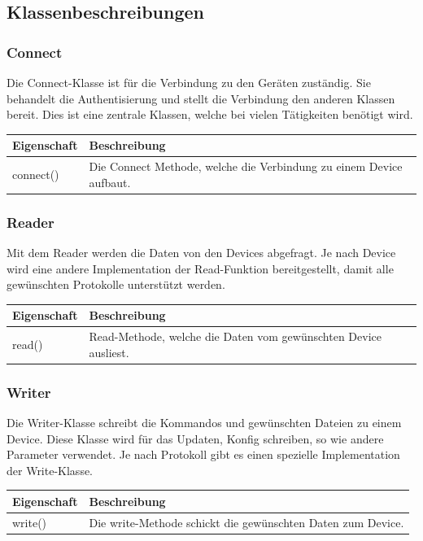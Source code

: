 \subsection{Klassenbeschreibungen}
\subsubsection{Connect}
Die Connect-Klasse ist für die Verbindung zu den Geräten zuständig. Sie behandelt die Authentisierung und stellt die Verbindung den anderen Klassen bereit. Dies ist eine zentrale Klassen, welche bei vielen Tätigkeiten benötigt wird.
\begin{table}[H]
\centering
    \begin{tabular}{@{}l p{14.1cm} @{}}\toprule    
    {Eigenschaft} & {Beschreibung}\\ \midrule
    connect() & Die Connect Methode, welche die Verbindung zu einem Device aufbaut.\\
    \bottomrule
    \end{tabular}
\end{table}

\subsubsection{Reader}
Mit dem Reader werden die Daten von den Devices abgefragt. Je nach Device wird eine andere Implementation der Read-Funktion bereitgestellt, damit alle gewünschten Protokolle unterstützt werden.
\noindent \begin{table}[H]
\centering
    \begin{tabular}{@{}l p{14.1cm} @{}}\toprule    
    {Eigenschaft} & {Beschreibung}\\ \midrule      
    read() & Read-Methode, welche die Daten vom gewünschten Device ausliest.\\
    \bottomrule
    \end{tabular}
\end{table}

\subsubsection{Writer}
Die Writer-Klasse schreibt die Kommandos und gewünschten Dateien zu einem Device. Diese Klasse wird für das Updaten, Konfig schreiben, so wie andere Parameter verwendet. Je nach Protokoll gibt es einen spezielle Implementation der Write-Klasse.
\noindent \begin{table}[H]
\centering
    \begin{tabular}{@{}l p{14.1cm} @{}}\toprule    
    {Eigenschaft} & {Beschreibung}\\ \midrule      
    write() & Die write-Methode schickt die gewünschten Daten zum Device. \\
    \bottomrule
    \end{tabular}
\end{table}



